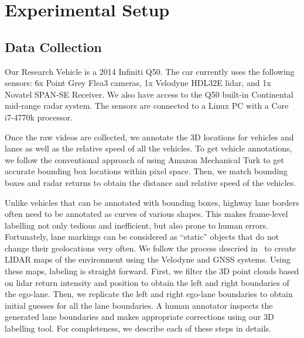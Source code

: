 \documentclass[journal]{IEEEtran}
\begin{document}
\section{Experimental Setup}

\subsection{Data Collection}
Our Research Vehicle is a 2014 Infiniti Q50. The car currently uses the following sensors: 6x Point Grey Flea3 cameras, 1x Velodyne HDL32E lidar, and 1x Novatel SPAN-SE Receiver. We also have access to the Q50 built-in Continental mid-range radar system. The sensors are connected to a Linux PC with a Core i7-4770k processor. 

Once the raw videos are collected, we annotate the 3D locations for vehicles and lanes as well as the relative speed of all the vehicles. To get vehicle annotations, we follow the conventional approach of using Amazon Mechanical Turk to get accurate bounding box locations within pixel space. Then, we match bounding boxes and radar returns to obtain the distance and relative speed of the vehicles. 

Unlike vehicles that can be annotated with bounding boxes, highway lane borders often need to be annotated as curves of various shapes. This makes frame-level labelling not only tedious and inefficient, but also prone to human errors. Fortunately, lane markings can be considered as “static” objects that do not change their geolocations very often. We follow the process descried in~\cite{levinson-2011} to create LIDAR maps of the environment using the Velodyne and GNSS systems. Using these maps, labeling is straight forward. First, we filter the 3D point clouds based on lidar return intensity and position to obtain the left and right boundaries of the ego-lane. Then, we replicate the left and right ego-lane boundaries to obtain initial guesses for all the lane boundaries. A human annotator inspects the generated lane boundaries and makes appropriate corrections using our 3D labelling tool. For completeness, we describe each of these steps in details.
 
\end{document}
